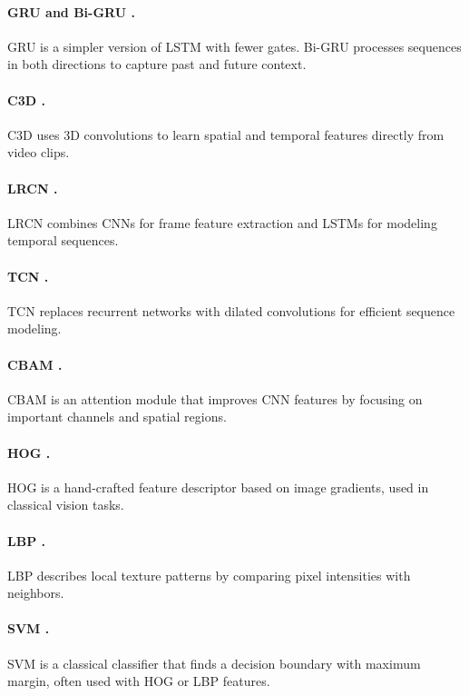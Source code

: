 \paragraph{\ac{GRU} and Bi-\ac{GRU} \cite{cho_gru_2014}.}
\ac{GRU} is a simpler version of \ac{LSTM} with fewer gates. Bi-\ac{GRU} processes sequences in both directions to capture past and future context.

\paragraph{C3D \cite{tran_c3d_2015}.}
C3D uses 3D convolutions to learn spatial and temporal features directly from video clips.

\paragraph{LRCN \cite{donahue_lrcn_2015}.}
LRCN combines \ac{CNN}s for frame feature extraction and \ac{LSTM}s for modeling temporal sequences.

\paragraph{\ac{TCN} \cite{bai_tcn_2018}.}
\ac{TCN} replaces recurrent networks with dilated convolutions for efficient sequence modeling.

\paragraph{CBAM \cite{woo_cbam_2018}.}
CBAM is an attention module that improves \ac{CNN} features by focusing on important channels and spatial regions.

\paragraph{\ac{HOG} \cite{dalal_hog_2005}.}
\ac{HOG} is a hand-crafted feature descriptor based on image gradients, used in classical vision tasks.

\paragraph{\ac{LBP} \cite{ojala_lbp_2002}.}
\ac{LBP} describes local texture patterns by comparing pixel intensities with neighbors.

\paragraph{\ac{SVM} \cite{cortes_svm_1995}.}
\ac{SVM} is a classical classifier that finds a decision boundary with maximum margin, often used with \ac{HOG} or \ac{LBP} features.

